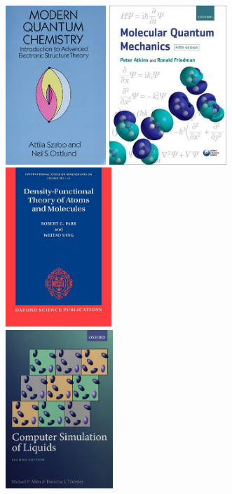 {\begin{figure}[H]
    \begin{center}
        \includegraphics[height=6cm]{fig/modern-qm.jpg} 
        \hspace{0.5em}
        \includegraphics[height=6cm]{fig/mol-quan-mech.jpeg} 
        \hspace{0.5em}
        \includegraphics[height=6cm]{fig/dft-atom-mol.jpg} \\
        \vspace{1em}
        \includegraphics[height=6cm]{fig/com-sim-liq.jpg} 

\end{center}
\end{figure}}

